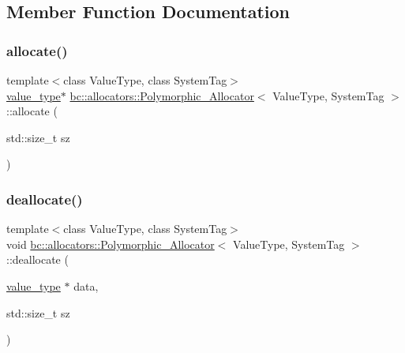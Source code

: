 \subsection{Member Function Documentation}
\mbox{\label{structbc_1_1allocators_1_1Polymorphic__Allocator_aa6a9f6a990f5442fceac09a0c03c3c68}} 
\subsubsection{\texorpdfstring{allocate()}{allocate()}}
{\footnotesize\ttfamily template$<$class Value\+Type, class System\+Tag$>$ \\
\hyperlink{structbc_1_1allocators_1_1Polymorphic__Allocator_a2655c4bc3c86364c42aa20639a1b7a44}{value\+\_\+type}$\ast$ \hyperlink{structbc_1_1allocators_1_1Polymorphic__Allocator}{bc\+::allocators\+::\+Polymorphic\+\_\+\+Allocator}$<$ Value\+Type, System\+Tag $>$\+::allocate (\begin{DoxyParamCaption}\item[{std\+::size\+\_\+t}]{sz }\end{DoxyParamCaption})\hspace{0.3cm}{\ttfamily [inline]}}

\mbox{\label{structbc_1_1allocators_1_1Polymorphic__Allocator_a9935a902159810ea1e948df8c586d76e}} 
\subsubsection{\texorpdfstring{deallocate()}{deallocate()}}
{\footnotesize\ttfamily template$<$class Value\+Type, class System\+Tag$>$ \\
void \hyperlink{structbc_1_1allocators_1_1Polymorphic__Allocator}{bc\+::allocators\+::\+Polymorphic\+\_\+\+Allocator}$<$ Value\+Type, System\+Tag $>$\+::deallocate (\begin{DoxyParamCaption}\item[{\hyperlink{structbc_1_1allocators_1_1Polymorphic__Allocator_a2655c4bc3c86364c42aa20639a1b7a44}{value\+\_\+type} $\ast$}]{data,  }\item[{std\+::size\+\_\+t}]{sz }\end{DoxyParamCaption})\hspace{0.3cm}{\ttfamily [inline]}}

